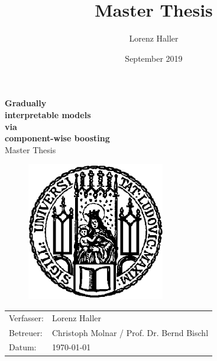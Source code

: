 \documentclass{article}
\title{Master Thesis}
\author{Lorenz Haller}
\date{September 2019}
\begin{document}
 
\begin{center}
\vspace*{0.5cm}
{\Huge \bf Gradually }\\
\vspace*{0.3cm}
{\Huge \bf interpretable models}\\
\vspace*{0.3cm}
{\Huge \bf via }\\
\vspace*{0.3cm}
{\Huge \bf component-wise boosting} \\
\vspace*{1cm}
{\Huge Master Thesis} \\
\vspace*{1cm}

\begin{figure}[htp]
    \centering
    \includegraphics[width=6cm]{LMU-siegel.png}
\end{figure}

\end{center}
\vspace*{2cm}

\begin{tabular}{ll}
Verfasser:  &Lorenz Haller \\
Betreuer: & Christoph Molnar / Prof. Dr. Bernd Bischl\\
Datum:			& \today \\
\end{tabular}

\newpage
\end{document}
